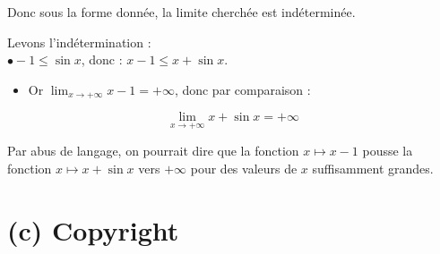 \documentclass[10pt]{article}
\begin{document}
Donc sous la forme donnée, la limite cherchée est indéterminée.

Levons l'indétermination :\\
$\bullet-1 \leq \sin x$, donc : $x-1 \leq x+\sin x$.

\begin{itemize}
  \item Or $\lim _{x \rightarrow+\infty} x-1=+\infty$, donc par comparaison :
\end{itemize}

$$
\lim _{x \rightarrow+\infty} x+\sin x=+\infty
$$

Par abus de langage, on pourrait dire que la fonction $x \longmapsto x-1$ pousse la fonction $x \longmapsto x+\sin x$ vers $+\infty$ pour des valeurs de $x$ suffisamment grandes.

\section*{(c) Copyright}
\end{document}
